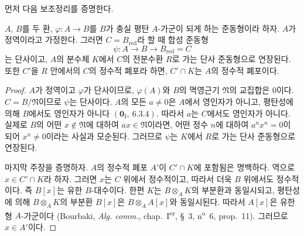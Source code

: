 먼저 다음 보조정리를 증명한다.

\begin{lemma}[23.2.7.1]
\label{0.23.2.7.1-ko}
$A$, $B$를 두 환, $\varphi:A\to B$를 $B$가 충실 평탄
$A$-가군이 되게 하는 준동형이라 하자. $A$가 정역이라고 가정한다.
그러면 $C=B_{\mathrm{red}}$라 할 때 합성 준동형
\[
  \psi:A\longrightarrow B\longrightarrow B_{\mathrm{red}}=C
\]
는 단사이고, $A$의 분수체 $K$에서 $C$의 전분수환 $R$로 가는
단사 준동형으로 연장된다. 또한 $C'$을 $R$ 안에서의 $C$의 정수적
폐포라 하면, $C'\cap K$는 $A$의 정수적 폐포이다.
\end{lemma}

\begin{proof}
$A$가 정역이고 $\varphi$가 단사이므로, $\varphi(A)$와 $B$의
멱영근기 $\mathfrak N$의 교집합은 $0$이다. $C=B/\mathfrak N$이므로
$\psi$는 단사이다. $A$의 모든 $a\neq0$은 $A$에서 영인자가 아니고,
평탄성에 의해 $B$에서도 영인자가 아니다
$(\mathbf 0_{\mathrm I},~6.3.4)$. 따라서 $a$는 $C$에서도 영인자가
아니다. 실제로 $B$의 어떤 $x\notin\mathfrak N$에 대하여
$ax\in\mathfrak N$이라면, 어떤 정수 $n$에 대하여
$a^nx^n=0$이 되어 $x^n\neq0$이라는 사실과 모순된다. 그러므로
$\psi$는 $K$에서 $R$로 가는 단사 준동형으로 연장된다.

마지막 주장을 증명하자. $A$의 정수적 폐포 $A'$이
$C'\cap K$에 포함됨은 명백하다. 역으로 $x\in C'\cap K$라 하자.
그러면 $x$는 $C$ 위에서 정수적이고, 따라서 더욱 $B$ 위에서도
정수적이다. 즉 $B[x]$는 유한 $B$-대수이다. 한편 $K$는
$B\otimes_AK$의 부분환과 동일시되고, 평탄성에 의해
$B\otimes_AK$의 부분환 $B[x]$은 $B\otimes_AA[x]$와 동일시된다.
따라서 $A[x]$은 유한형 $A$-가군이다
(Bourbaki, \emph{Alg. comm.}, chap.~I\textsuperscript{er}, §~3,
n\textsuperscript{o}~6, prop.~11). 그러므로 $x\in A'$이다.
\end{proof}

